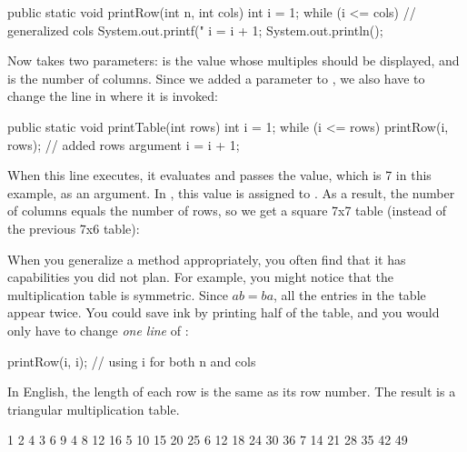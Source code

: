 \begin{code}
public static void printRow(int n, int cols) {
    int i = 1;
    while (i <= cols) {  // generalized cols
        System.out.printf("%
        i = i + 1;
    }
    System.out.println();
}
\end{code}

Now  takes two parameters:  is the value whose multiples should be displayed, and  is the number of columns.
Since we added a parameter to , we also have to change the line in  where it is invoked:

\begin{code}
public static void printTable(int rows) {
    int i = 1;
    while (i <= rows) {
        printRow(i, rows);  // added rows argument
        i = i + 1;
    }
}
\end{code}

When this line executes, it evaluates  and passes the value, which is 7 in this example, as an argument.
In , this value is assigned to .
As a result, the number of columns equals the number of rows, so we get a square 7x7 table (instead of the previous 7x6 table):


When you generalize a method appropriately, you often find that it has capabilities you did not plan.
For example, you might notice that the multiplication table is symmetric.
Since $ab = ba$, all the entries in the table appear twice.
You could save ink by printing half of the table, and you would only have to change {\em one line} of :

\begin{code}
printRow(i, i);  // using i for both n and cols
\end{code}

In English, the length of each row is the same as its row number.
The result is a triangular multiplication table.

\begin{stdout}
   1
   2   4
   3   6   9
   4   8  12  16
   5  10  15  20  25
   6  12  18  24  30  36
   7  14  21  28  35  42  49
\end{stdout}

